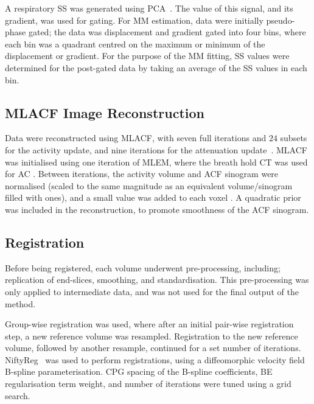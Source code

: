         A respiratory \gls{SS} was generated using \gls{PCA}~\cite{Thielemans2011}. The value of this signal, and its gradient, was used for gating. For \gls{MM} estimation, data were initially pseudo-phase gated; the data was displacement and gradient gated into four bins, where each bin was a quadrant centred on the maximum or minimum of the displacement or gradient. %
        For the purpose of the \gls{MM} fitting, \gls{SS} values were determined for the post-gated data by taking an average of the \gls{SS} values in each bin.
        
    \subsection{\acrshort{MLACF} Image Reconstruction} \label{sec:mlacf_image_reconstruction}
        Data were reconstructed using \acrshort{MLACF}, with seven full iterations and $24$ subsets for the activity update, and nine iterations for the attenuation update~\cite{Nuyts2012ML-reconstructionFactors}. \acrshort{MLACF} was initialised using one iteration of \acrshort{MLEM}, where the breath hold \acrshort{CT} was used for \gls{AC}%
        . Between iterations, the activity volume and \gls{ACF} sinogram were normalised (scaled to the same magnitude as an equivalent volume/sinogram filled with ones), and a small value was added to each voxel%
        . A quadratic prior was included in the reconstruction, to promote smoothness of the \gls{ACF} sinogram.
    
    
    \subsection{Registration} \label{sec:registration}
        Before being registered, each volume underwent pre-processing, including; replication of end-slices, smoothing, and standardisation. This pre-processing was only applied to intermediate data, and was not used for the final output of the method.
        
        Group-wise registration was used, where after an initial pair-wise registration step, a new reference volume was resampled. Registration to the new reference volume, followed by another resample, continued for a set number of iterations. NiftyReg~\cite{Modat2010} was used to perform registrations, using a diffeomorphic velocity field B-spline parameterisation. \acrlong{CPG} spacing of the B-spline coefficients, \acrlong{BE} regularisation term weight, and number of iterations were tuned using a grid search.
        
